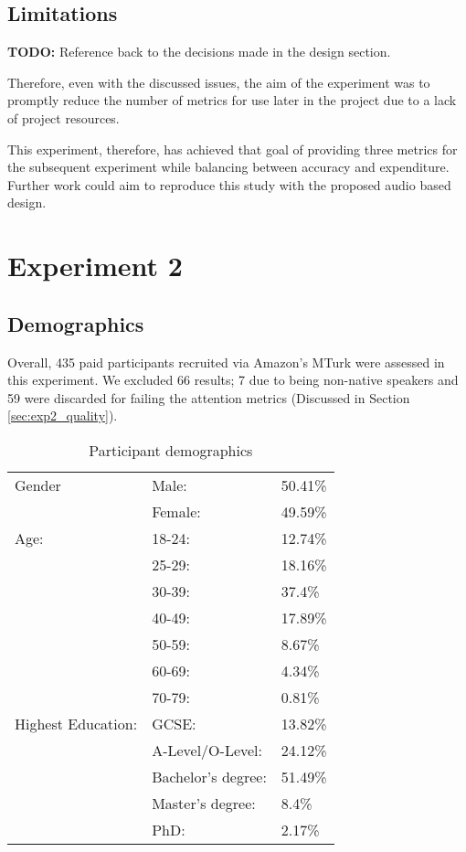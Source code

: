\subsection{Limitations}

\textbf{TODO: } Reference back to the decisions made in the design section.

Therefore, even with the discussed issues, the aim of the experiment was to promptly reduce the number of metrics for use later in the project due to a lack of project resources.

This experiment, therefore, has achieved that goal of providing three metrics for the subsequent experiment while balancing between accuracy and expenditure. Further work could aim to reproduce this study with the proposed audio based design.



\newpage

\section{Experiment 2}
\label{sec:exp2}

\subsection*{Demographics}
Overall, 435 paid participants recruited via Amazon's MTurk were assessed in this experiment. We excluded 66 results; 7 due to being non-native speakers and 59 were discarded for failing the attention metrics (Discussed in Section \ref{sec:exp2_quality}).

\begin{table}[h]
    \centering
    \begin{tabular}{|l|ll|}
        \hline
        Gender & Male: & 50.41\% \\
               & Female: & 49.59\% \\
        \hline
        Age:   & 18-24: & 12.74\% \\ 
               & 25-29: & 18.16\% \\ 
               & 30-39: & 37.4\% \\ 
               & 40-49: & 17.89\% \\ 
               & 50-59: & 8.67\% \\ 
               & 60-69: & 4.34\% \\ 
               & 70-79: & 0.81\% \\ 

        \hline
        Highest Education:  
        & GCSE:                 & 13.82\%  \\
        & A-Level/O-Level:      & 24.12\% \\
        & Bachelor's degree:    & 51.49\% \\
        & Master's degree:      & 8.4\% \\ 
        & PhD:                  & 2.17\% \\
        \hline

    \end{tabular}
    \caption{Participant demographics}
    \label{tab:exp2_demo}
\end{table}

